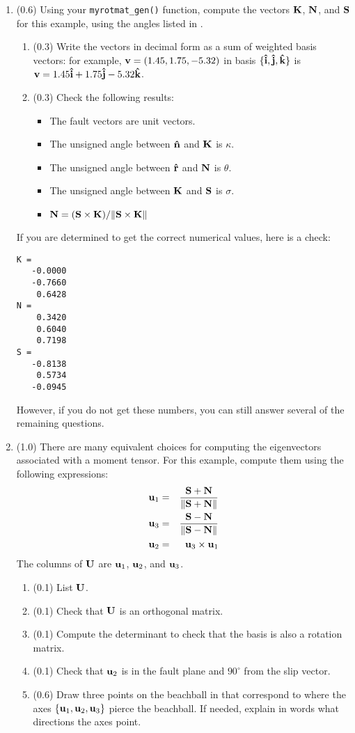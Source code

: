 \documentclass[11pt,titlepage,fleqn]{article}
\newcommand{\rotvec}{\bv}      %
\begin{document}
\begin{enumerate}

\item (0.6) Using your \verb+myrotmat_gen()+ function, compute the vectors $\mbox{${\bf K}$}$, $\mbox{${\bf N}$}$, and $\mbox{${\bf S}$}$ for this example, using the angles listed in .
%
\begin{enumerate}
\item (0.3) Write the vectors in decimal form as a sum of weighted basis vectors: for example, $\mbox{${\bf v}$} = (1.45,1.75,-5.32)$ in basis $\{\mbox{\boldmath{$\hat{\rm i}$}},\mbox{\boldmath{$\hat{\rm j}$}},\mbox{\boldmath{$\hat{\rm k}$}}\}$ is $\rotvec = 1.45\bih + 1.75\bjh - 5.32\bkh$.

\item (0.3) Check the following results:
%
\begin{itemize}
\item The fault vectors are unit vectors.
\item The unsigned angle between $\mbox{\boldmath{$\hat{\rm n}$}}$ and $\mbox{${\bf K}$}$ is $\kappa$.
\item The unsigned angle between $\mbox{\boldmath{$\hat{\rm r}$}}$ and $\mbox{${\bf N}$}$ is $\theta$.
\item The unsigned angle between $\mbox{${\bf K}$}$ and $\mbox{${\bf S}$}$ is $\sigma$.
\item $\mbox{${\bf N}$} = (\mbox{${\bf S}$} \times \mbox{${\bf K}$})/\| \mbox{${\bf S}$} \times \mbox{${\bf K}$} \|$
\end{itemize}

\end{enumerate}
%
If you are determined to get the correct numerical values, here is a check:
%
\begin{verbatim}
K =
   -0.0000
   -0.7660
    0.6428
N =
    0.3420
    0.6040
    0.7198
S =
   -0.8138
    0.5734
   -0.0945
\end{verbatim}
%
However, if you do not get these numbers, you can still answer several of the remaining questions.


\item (1.0) There are many equivalent choices for computing the eigenvectors associated with a moment tensor. For this example, compute them using the following expressions:
%
\begin{eqnarray*}
\mbox{${\bf u}$}_1 &=& \frac{\mbox{${\bf S}$} + \mbox{${\bf N}$}}{\| \mbox{${\bf S}$} + \mbox{${\bf N}$} \|}
\\
\mbox{${\bf u}$}_3 &=& \frac{\mbox{${\bf S}$} - \mbox{${\bf N}$}}{\| \mbox{${\bf S}$} - \mbox{${\bf N}$} \|}
\\
\mbox{${\bf u}$}_2 &=& \mbox{${\bf u}$}_3  \times \mbox{${\bf u}$}_1
\end{eqnarray*}
%
The columns of $\mbox{${\bf U}$}$ are $\mbox{${\bf u}$}_1$, $\mbox{${\bf u}$}_2$, and $\mbox{${\bf u}$}_3$.
%
\begin{enumerate}
\item (0.1) List $\mbox{${\bf U}$}$.
\item (0.1) Check that $\mbox{${\bf U}$}$ is an orthogonal matrix.
\item (0.1) Compute the determinant to check that the basis is also a rotation matrix.
\item (0.1) Check that $\mbox{${\bf u}$}_2$ is in the fault plane and $90^\circ$ from the slip vector.
\item (0.6) Draw three points on the beachball in  that correspond to where the axes $\{\mbox{${\bf u}$}_1,\mbox{${\bf u}$}_2,\mbox{${\bf u}$}_3\}$ pierce the beachball. If needed, explain in words what directions the axes point.
\end{enumerate}


\end{enumerate}
\end{document}
